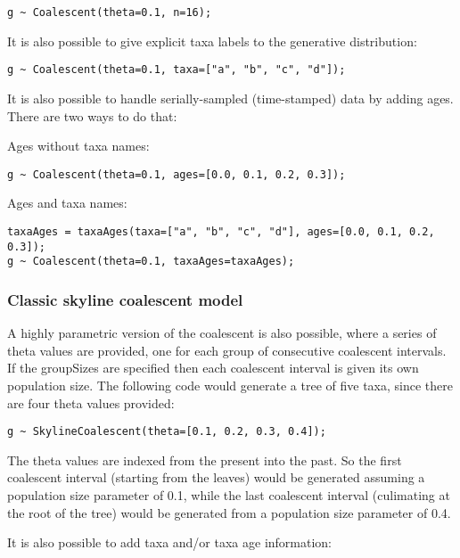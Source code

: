 \documentclass[11pt]{article}
\begin{document}
\begin{verbatim}
g ~ Coalescent(theta=0.1, n=16);
\end{verbatim}

It is also possible to give explicit taxa labels to the generative distribution:

\begin{verbatim}
g ~ Coalescent(theta=0.1, taxa=["a", "b", "c", "d"]);
\end{verbatim}

It is also possible to handle serially-sampled (time-stamped) data by adding ages. There are two ways to do that:

Ages without taxa names:

\begin{verbatim}
g ~ Coalescent(theta=0.1, ages=[0.0, 0.1, 0.2, 0.3]);
\end{verbatim}

Ages and taxa names:

\begin{verbatim}
taxaAges = taxaAges(taxa=["a", "b", "c", "d"], ages=[0.0, 0.1, 0.2, 0.3]);
g ~ Coalescent(theta=0.1, taxaAges=taxaAges);
\end{verbatim}



\subsubsection{Classic skyline coalescent model}

A highly parametric version of the coalescent is also possible, where a series of theta values are provided, one for each
group of consecutive coalescent intervals. If the groupSizes are specified then each coalescent interval is given its
own population size. The following code would generate a tree of five taxa, since there are four theta values provided:

\begin{verbatim}
g ~ SkylineCoalescent(theta=[0.1, 0.2, 0.3, 0.4]);
\end{verbatim}

The theta values are indexed from the present into the past. So the first coalescent interval (starting from the leaves)
would be generated assuming a population size parameter of 0.1, while the last coalescent interval (culimating at the
root of the tree) would be generated from a population size parameter of 0.4.

It is also possible to add taxa and/or taxa age information:
\end{document}
